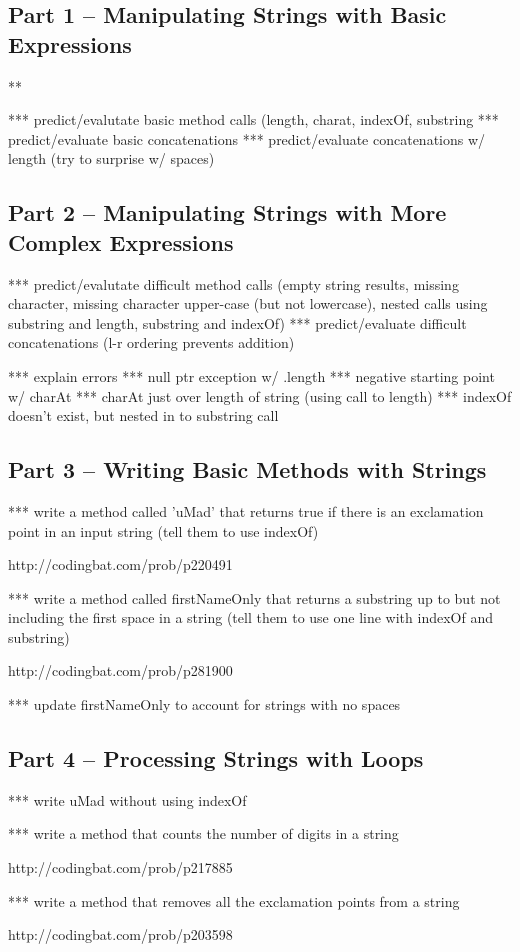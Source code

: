 \subsection{Part 1 -- Manipulating Strings with Basic Expressions}

\begin{eval}
\begin{sevalenum}
\item ***
\evalline
\end{sevalenum}
\end{eval}
*** predict/evalutate basic method calls (length, charat, indexOf, substring
*** predict/evaluate basic concatenations
*** predict/evaluate concatenations w/ length (try to surprise w/ spaces)



\subsection{Part 2 -- Manipulating Strings with More Complex Expressions}
*** predict/evalutate difficult method calls (empty string results, missing character, missing character upper-case (but not lowercase), nested calls using substring and length, substring and indexOf)
*** predict/evaluate difficult concatenations (l-r ordering prevents addition)

*** explain errors
	*** null ptr exception w/ .length
	*** negative starting point w/ charAt
	*** charAt just over length of string (using call to length)
	*** indexOf doesn't exist, but nested in to substring call


\initialbox

\subsection{Part 3 -- Writing Basic Methods with Strings}

*** write a method called 'uMad' that returns true if there is an exclamation point in an input string (tell them to use indexOf)

http://codingbat.com/prob/p220491

*** write a method called firstNameOnly that returns a substring up to but not including the first space in a string (tell them to use one line with indexOf and substring)

http://codingbat.com/prob/p281900

*** update firstNameOnly to account for strings with no spaces

\initialbox


\subsection{Part 4 -- Processing Strings with Loops}

*** write uMad without using indexOf

*** write a method that counts the number of digits in a string

http://codingbat.com/prob/p217885

*** write a method that removes all the exclamation points from a string

http://codingbat.com/prob/p203598

\initialbox

